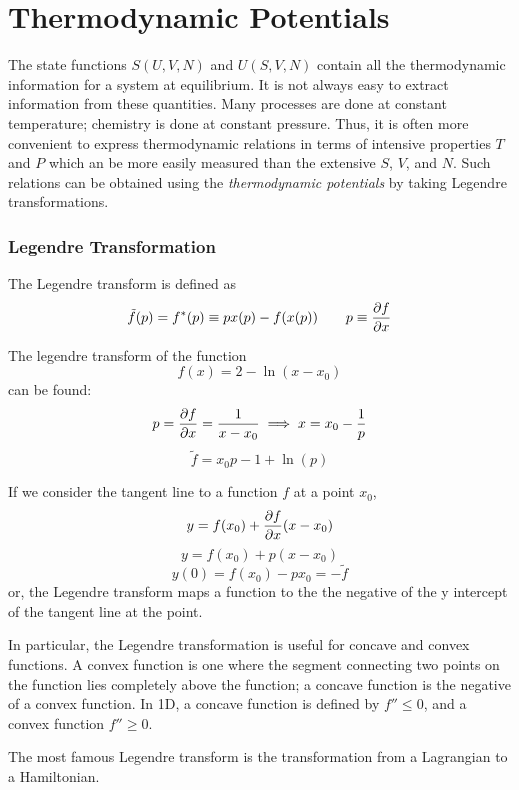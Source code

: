\chapter{Thermodynamic Potentials}
The state functions \(S(U,V,N)\) and \(U(S,V,N)\) contain all the thermodynamic information for a system at equilibrium. It is not always easy to extract information from these quantities. Many processes are done at constant temperature; chemistry is done at constant pressure. Thus, it is often more convenient to express thermodynamic relations in terms of intensive properties \(T\) and \(P\) which an be more easily measured than the extensive \(S\), \(V\), and \(N\). Such relations can be obtained using the \emph{thermodynamic potentials} by taking Legendre transformations.

\subsection{Legendre Transformation}
The Legendre transform is defined as
\begin{equation}
	\tilde{f}(p)=f\ast(p)\equiv px(p)-f(x(p)) \qquad p\equiv \pder{f}{x} \label{eq11:legendre}
\end{equation}

\begin{aside}
The legendre transform of the function
\[f(x)=2-\ln(x-x_0)\]
can be found:
\[p=\frac{\partial f}{\partial x}=\frac{1}{x-x_0}\implies x=x_0-\frac{1}{p}\]
\[\tilde{f}=x_0p-1+\ln(p)\]
\end{aside}

If we consider the tangent line to a function \(f\) at a point \(x_0\),
\[y=f(x_0)+\frac{\partial f}{\partial x}(x-x_0)\]
\[y=f(x_0)+p(x-x_0)\]
\begin{equation}
	y(0)=f(x_0)-px_0=-\tilde{f}
\end{equation}
or, the Legendre transform maps a function to the the negative of the y intercept of the tangent line at the point.

In particular, the Legendre transformation is useful for concave and convex functions. A convex function is one where the segment connecting two points on the function lies completely above the function; a concave function is the negative of a convex function. In 1D, a concave function is defined by \(f''\leq0\), and a convex function \(f''\geq0\). 

The most famous Legendre transform is the transformation from a Lagrangian to a Hamiltonian.

